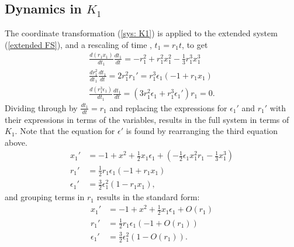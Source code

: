 \subsection{Dynamics in \texorpdfstring{$K_1$}{K1}}\label{sec:dynamics-in-k1} 
The coordinate transformation (\ref{sys: K1}) is applied to the extended system (\ref{extended FS}), and a rescaling of time , $t_1=r_1t$, to get
\begin{align*}
\frac{d(r_1x_1)}{dt_1} \frac{dt_1}{dt} = -r_1^2 + r_1^2x_1^2 - \frac{1}{3}r_1^3x_1^3\\
\frac{dr_1^2}{dt_1}\frac{dt_1}{dt}= 2r_1^2r_1' = r_1^3 \epsilon_1 (-1 +r_1 x_1)\\
\frac{d(r_1^3 \epsilon_1)}{dt_1}\frac{dt_1}{dt}= (3r_1^2\epsilon_1 + r_1^3 \epsilon_1') r_1 = 0.
\end{align*}
Dividing through by $\frac{dt_1}{dt}=r_1$ and replacing the expressions for $\epsilon_1'$ and $r_1'$ with their expressions in terms of the variables, results in the full system in terms of $K_1$. Note that the equation for $\epsilon'$ is found by rearranging the third equation above. 
\begin{align*}
x_1' &= -1 +x^2 + \frac{1}{2} x_1 \epsilon_1 + \left( - \frac{1}{2} \epsilon_1 x_1^2r_1 - \frac{1}{3} x_1^3 \right)\\
r_1' &= \frac{1}{2} r_1 \epsilon_1( -1 + r_1 x_1)\\
\epsilon_1' &= \frac{3}{2} \epsilon_1^2 ( 1- r_1x_1),
\end{align*}
and grouping terms in $r_1$ results in the standard form:
\begin{equation}
\begin{aligned} \label{K1systemfull}
x_1' &= -1 +x^2 + \frac{1}{2} x_1 \epsilon_1 +O(r_1)\\
r_1' &= \frac{1}{2} r_1 \epsilon_1( -1 + O(r_1))\\
\epsilon_1' &= \frac{3}{2} \epsilon_1^2 ( 1- O(r_1)).
\end{aligned}
\end{equation}

